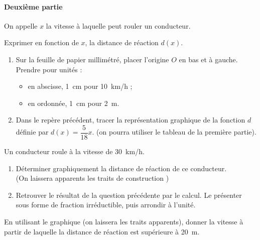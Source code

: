 \paragraph{Deuxième partie}\hfill\newline
On appelle $x$ la vitesse à laquelle peut rouler un conducteur.
\begin{myenumerate}
\item  Exprimer en fonction de $x$, la distance de réaction $d(x)$.
\item \begin{enumerate}
\item  Sur la feuille de papier millimétré, placer l'origine $O$ en bas et à gauche.\\
Prendre pour unités :
\begin{itemize}
\item  en abscisse, 1~cm pour 10~km/h ;
\item  en ordonnée, 1~cm pour 2~m.
\end{itemize}
\item Dans le repère précédent, tracer la représentation graphique de la fonction $d$
définie par $d(x)=\dfrac{5}{18}x$. (on pourra utiliser le tableau de la première partie).
\end{enumerate}
\item Un conducteur roule à la vitesse de 30~km/h.
\begin{enumerate}
\item Déterminer graphiquement la distance de réaction de ce conducteur.\\
(On laissera apparents les traits de construction )
\item Retrouver le résultat de la question précédente par le calcul. Le présenter sous forme de fraction irréductible, puis arrondir à l'unité.
 \end{enumerate}
\item En utilisant le graphique (on laissera les traits apparents), donner la vitesse à partir de laquelle la distance de réaction est supérieure à 20~m.
\end{myenumerate}